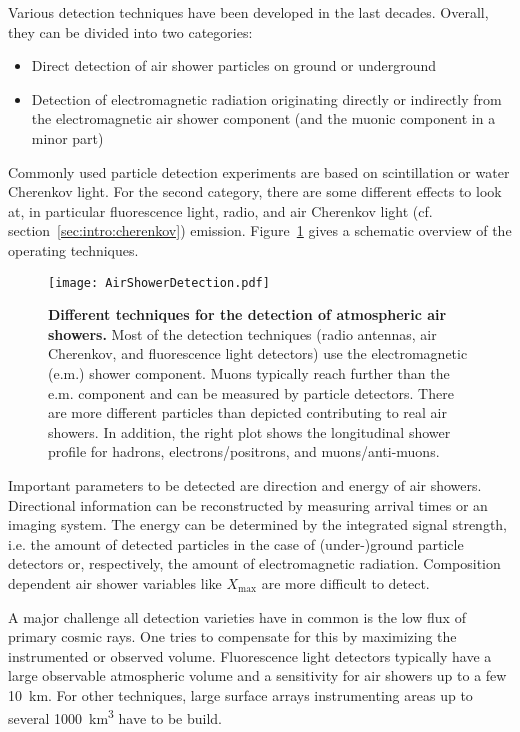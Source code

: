 Various detection techniques have been developed in the last decades. Overall, they can be divided into two categories:
\begin{itemize}
	\item Direct detection of air shower particles on ground or underground
	\item Detection of electromagnetic radiation originating directly or indirectly from the electromagnetic air shower component (and the muonic component in a minor part)
\end{itemize}
Commonly used particle detection experiments are based on scintillation or water Cherenkov light.
For the second category, there are some different effects to look at, in particular fluorescence light, radio, and air Cherenkov light (cf. section~\ref{sec:intro:cherenkov}) emission. Figure~\ref{intro:airshower_detection_sketch} gives a schematic overview of the operating techniques.~\cite{airshowers:schroeder}\\

\begin{figure}[h]
	\texttt{[image: AirShowerDetection.pdf]}
	\caption[Different techniques for air shower detection]{\textbf{Different techniques for the detection of atmospheric air showers.} \cite{airshowers:schroeder} Most of the detection techniques (radio antennas, air Cherenkov, and fluorescence light detectors) use the electromagnetic (e.m.) shower component. Muons typically reach further than the e.m. component and can be measured by particle detectors. There are more different particles than depicted contributing to real air showers. In addition, the right plot shows the longitudinal shower profile for hadrons, electrons/positrons, and muons/anti-muons.}	
	\label{intro:airshower_detection_sketch}
\end{figure}

Important parameters to be detected are direction and energy of air showers. Directional information can be reconstructed by measuring arrival times or an imaging system. The energy can be determined by the integrated signal strength, i.e. the amount of detected particles in the case of (under-)ground particle detectors or, respectively, the amount of electromagnetic radiation. Composition dependent air shower variables like $X_\text{max}$ are more difficult to detect.

A major challenge all detection varieties have in common is the low flux of primary cosmic rays. One tries to compensate for this by maximizing the instrumented or observed volume. Fluorescence light detectors typically have a large observable atmospheric volume and a sensitivity for air showers up to a few \SI{10}{\kilo\meter}. For other techniques, large surface arrays instrumenting areas up to several \SI{1000}{\cubic\kilo\meter} have to be build.~\cite{airshowers:schroeder}\\

